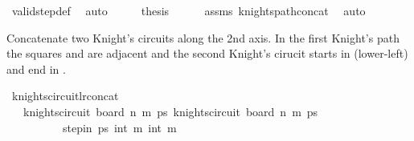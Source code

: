 \begin{isabellebody}
\ valid{\isacharunderscore}{\kern0pt}step{\isacharunderscore}{\kern0pt}def\ \isamarkupfalse%
\ auto\isanewline
\ \ \isamarkupfalse%
\ \isamarkupfalse%
\ {\isacharquery}{\kern0pt}thesis\isanewline
\ \ \ \ \isamarkupfalse%
\ assms\ knights{\isacharunderscore}{\kern0pt}path{\isacharunderscore}{\kern0pt}concat\ \isamarkupfalse%
\ auto\isanewline
{}\isamarkupfalse%
%
\endisatagproof
{\isafoldproof}%
%
\isadelimproof
%
\endisadelimproof
%
\begin{isamarkuptext}%
Concatenate two Knight's circuits along the 2nd axis. In the first Knight's path the 
squares  and  are adjacent and the second Knight's cirucit starts in  
(lower-left) and end in .%
\end{isamarkuptext}\isamarkuptrue%
\isamarkupfalse%
\ knights{\isacharunderscore}{\kern0pt}circuit{\isacharunderscore}{\kern0pt}lr{\isacharunderscore}{\kern0pt}concat{\isacharcolon}{\kern0pt}\isanewline
\ \ \ {\isachardoublequoteopen}knights{\isacharunderscore}{\kern0pt}circuit\ {\isacharparenleft}{\kern0pt}board\ n\ m\ ps\ {\isachardoublequoteopen}knights{\isacharunderscore}{\kern0pt}circuit\ {\isacharparenleft}{\kern0pt}board\ n\ m\ ps\isanewline
\ \ \ \ \ \ \ \ \ \ {\isachardoublequoteopen}step{\isacharunderscore}{\kern0pt}in\ ps\ {\isacharparenleft}{\kern0pt}{}{\isacharcomma}{\kern0pt}int\ m\ {\isacharparenleft}{\kern0pt}{}{\isacharcomma}{\kern0pt}int\ m\ \isanewline

\end{isabellebody}
